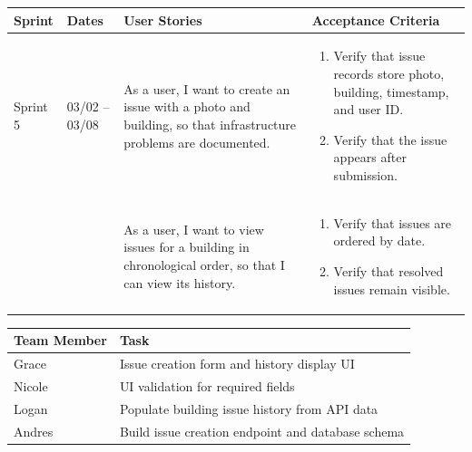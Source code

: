 \documentclass[12pt]{article}
\begin{document}
\vspace{2em}


\vspace{0.5em}

\noindent
\begin{tabular}{|L{1.2cm}|L{1.8cm}|L{5.2cm}|L{6.3cm}|}
\hline
\textbf{Sprint} & \textbf{Dates} & \textbf{User Stories} & \textbf{Acceptance Criteria} \\
\hline
Sprint 5 & 03/02 -- 03/08 &
As a user, I want to create an issue with a photo and building, so that infrastructure problems are documented. &
\begin{enumerate}
    \item Verify that issue records store photo, building, timestamp, and user ID.
    \item Verify that the issue appears after submission.
\end{enumerate} \\
& &
As a user, I want to view issues for a building in chronological order, so that I can view its history. &
\begin{enumerate}
    \item Verify that issues are ordered by date.
    \item Verify that resolved issues remain visible.
\end{enumerate} \\
\hline
\end{tabular}

\vspace{0.5em}

\noindent
\begin{tabular}{|L{2.5cm}|L{12.5cm}|}
\hline
\textbf{Team Member} & \textbf{Task} \\
\hline
Grace & Issue creation form and history display UI \\
\hline
Nicole & UI validation for required fields \\
\hline
Logan & Populate building issue history from API data \\
\hline
Andres & Build issue creation endpoint and database schema \\
\hline
\end{tabular}

\vspace{2em}

\end{document}
